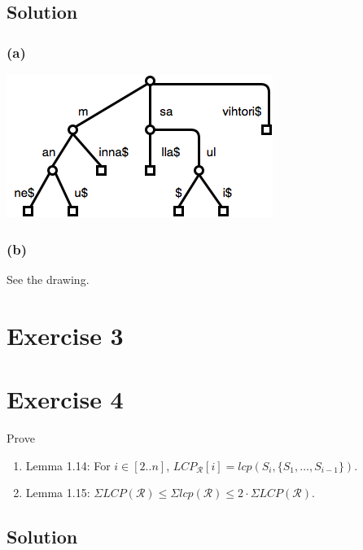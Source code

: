 \documentclass[10pt]{article}
\begin{document}
\subsection*{Solution}
\subsubsection*{(a)}
\begin{center}
\includegraphics[scale=0.65]{CompactTrie}
\end{center}

\subsubsection*{(b)}
See the drawing.

\section*{Exercise 3}

\section*{Exercise 4}
\color{blue}
Prove
\begin{enumerate}[label=(\alph*)]
\item Lemma 1.14: For $i \in [2..n]$, $LCP_{\mathcal{R}}[i] = lcp(S_i, \{ S_1, \dots, S_{i - 1} \})$.
\item Lemma 1.15: $\Sigma LCP(\mathcal{R}) \leq \Sigma lcp(\mathcal{R}) \leq 2 \cdot \Sigma LCP(\mathcal{R})$.
\end{enumerate}
\color{black}
\subsection*{Solution}
\end{document}
